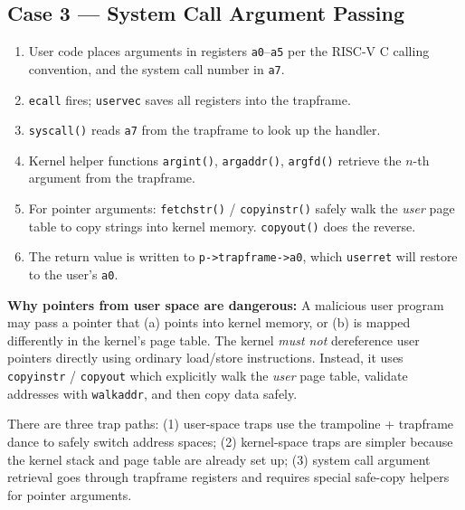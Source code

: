 \documentclass[11pt, a4paper]{article}
\begin{document}
\subsection{Case 3 — System Call Argument Passing}

\begin{tcolorbox}[lifecycle, title={System Call Argument Lifecycle}]
\begin{enumerate}[leftmargin=1.8em, itemsep=0.25em]
  \item User code places arguments in registers \lstinline|a0|--\lstinline|a5| per the RISC-V C calling convention, and the system call number in \lstinline|a7|.
  \item \lstinline|ecall| fires; \lstinline|uservec| saves all registers into the trapframe.
  \item \lstinline|syscall()| reads \lstinline|a7| from the trapframe to look up the handler.
  \item Kernel helper functions \lstinline|argint()|, \lstinline|argaddr()|, \lstinline|argfd()| retrieve the $n$-th argument from the trapframe.
  \item For pointer arguments: \lstinline|fetchstr()| / \lstinline|copyinstr()| safely walk the \emph{user} page table to copy strings into kernel memory. \lstinline|copyout()| does the reverse.
  \item The return value is written to \lstinline|p->trapframe->a0|, which \lstinline|userret| will restore to the user's \lstinline|a0|.
\end{enumerate}
\end{tcolorbox}

\begin{tcolorbox}[foundational]
\textbf{Why pointers from user space are dangerous:} A malicious user program may pass a pointer that (a) points into kernel memory, or (b) is mapped differently in the kernel's page table. The kernel \emph{must not} dereference user pointers directly using ordinary load/store instructions. Instead, it uses \lstinline|copyinstr| / \lstinline|copyout| which explicitly walk the \emph{user} page table, validate addresses with \lstinline|walkaddr|, and then copy data safely.
\end{tcolorbox}

\begin{tcolorbox}[summary, title={Section Summary}]
There are three trap paths: (1) user-space traps use the trampoline + trapframe dance to safely switch address spaces; (2) kernel-space traps are simpler because the kernel stack and page table are already set up; (3) system call argument retrieval goes through trapframe registers and requires special safe-copy helpers for pointer arguments.
\end{tcolorbox}
\end{document}
